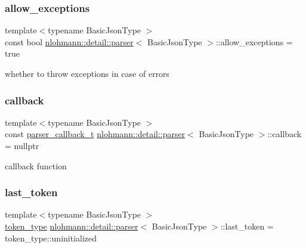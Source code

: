 \subsubsection{\texorpdfstring{allow\_exceptions}{allow\_exceptions}}
{\footnotesize\ttfamily template$<$typename Basic\+Json\+Type $>$ \\
const bool \mbox{\hyperlink{classnlohmann_1_1detail_1_1parser}{nlohmann\+::detail\+::parser}}$<$ Basic\+Json\+Type $>$\+::allow\+\_\+exceptions = true\hspace{0.3cm}{\ttfamily [private]}}



whether to throw exceptions in case of errors 

\mbox{\label{classnlohmann_1_1detail_1_1parser_a7600d272ec605e3ffdc8512b3585f476}} 
\subsubsection{\texorpdfstring{callback}{callback}}
{\footnotesize\ttfamily template$<$typename Basic\+Json\+Type $>$ \\
const \mbox{\hyperlink{classnlohmann_1_1detail_1_1parser_ad250ad4f2b4af4a497e727c963162ff1}{parser\+\_\+callback\+\_\+t}} \mbox{\hyperlink{classnlohmann_1_1detail_1_1parser}{nlohmann\+::detail\+::parser}}$<$ Basic\+Json\+Type $>$\+::callback = nullptr\hspace{0.3cm}{\ttfamily [private]}}



callback function 

\mbox{\label{classnlohmann_1_1detail_1_1parser_a932e49f6f4d291557846744319245994}} 
\subsubsection{\texorpdfstring{last\_token}{last\_token}}
{\footnotesize\ttfamily template$<$typename Basic\+Json\+Type $>$ \\
\mbox{\hyperlink{classnlohmann_1_1detail_1_1parser_a21d247111b332785b7acf3f8e487d117}{token\+\_\+type}} \mbox{\hyperlink{classnlohmann_1_1detail_1_1parser}{nlohmann\+::detail\+::parser}}$<$ Basic\+Json\+Type $>$\+::last\+\_\+token = token\+\_\+type\+::uninitialized\hspace{0.3cm}{\ttfamily [private]}}



